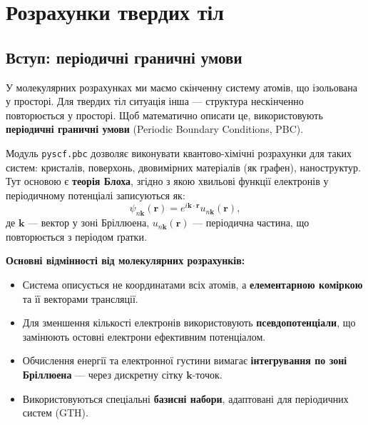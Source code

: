 

\chapter{Розрахунки твердих тіл}\label{\currfilebase}

\section{Вступ: періодичні граничні умови}

У молекулярних розрахунках ми маємо скінченну систему атомів, що ізольована у просторі.
Для твердих тіл ситуація інша --- структура нескінченно повторюється у просторі.
Щоб математично описати це, використовують \textbf{періодичні граничні умови} (Periodic Boundary Conditions, PBC).

Модуль \texttt{pyscf.pbc} дозволяє виконувати квантово-хімічні розрахунки для таких систем: кристалів, поверхонь, двовимірних матеріалів (як графен), наноструктур.
Тут основою є \textbf{теорія Блоха}, згідно з якою хвильові функції електронів у періодичному потенціалі записуються як:
\[
    \psi_{n\mathbf{k}}(\mathbf{r}) = e^{i \mathbf{k} \cdot \mathbf{r}} u_{n\mathbf{k}}(\mathbf{r}),
\]
де $\mathbf{k}$ --- вектор у зоні Бріллюена, $u_{n\mathbf{k}}(\mathbf{r})$ --- періодична частина, що повторюється з періодом ґратки.

\textbf{Основні відмінності від молекулярних розрахунків:}
\begin{itemize}
    \item Система описується не координатами всіх атомів, а \textbf{елементарною коміркою} та її векторами трансляції.
    \item Для зменшення кількості електронів використовують \textbf{псевдопотенціали}, що замінюють остовні електрони ефективним потенціалом.
    \item Обчислення енергії та електронної густини вимагає \textbf{інтегрування по зоні Бріллюена} --- через дискретну сітку $\mathbf{k}$-точок.
    \item Використовуються спеціальні \textbf{базисні набори}, адаптовані для періодичних систем (GTH).
\end{itemize}

